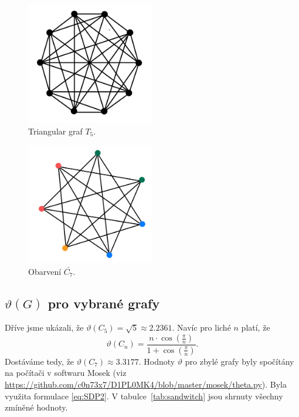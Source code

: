 \begin{figure}[h!]
    \centering
    \includegraphics[width=0.5\textwidth]{img/complement_petersen.jpeg}   
    \caption{Triangular graf $T_5$.}
    \label{fig:complement_petersen}
\end{figure}

\begin{figure}[h!]
    \centering
    \includegraphics[width=0.5\textwidth]{img/complement_c7.jpeg}   
    \caption{Obarvení $\bar{C_7}$.}
    \label{fig:complement_c7}
\end{figure}

\subsection*{$\vartheta(G)$ pro vybrané grafy}

Dříve jsme ukázali, že $\vartheta(C_5) = \sqrt{5} \approx 2.2361$. Navíc pro liché $n$ platí, že
$$
    \vartheta(C_n) = \frac{n \cdot \cos(\frac{\pi}{n})}{1 + \cos(\frac{\pi}{n})}.
$$
Dostáváme tedy, že $\vartheta({C_7}) \approx 3.3177$. Hodnoty $\vartheta$ pro zbylé grafy byly spočítány na počítači v softwaru Mosek (viz \url{https://github.com/c0n73x7/D1PL0MK4/blob/master/mosek/theta.py}). Byla využita formulace \ref{eq:SDP2}. V tabulce~\ref{tab:sandwitch} jsou shrnuty všechny zmíněné hodnoty.

